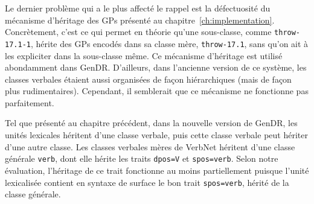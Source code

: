 Le dernier problème qui a le plus affecté le rappel est la défectuosité du mécanisme d'héritage des \acp{GP} présenté au chapitre~\ref{ch:implementation}. Concrètement, c'est ce qui permet en théorie qu'une sous-classe, comme \texttt{throw-17.1-1}, hérite des \acp{GP} encodés dans sa classe mère, \texttt{throw-17.1}, sans qu'on ait à les expliciter dans la sous-classe même. Ce mécanisme d'héritage est utilisé abondamment dans GenDR. D'ailleurs, dans l'ancienne version de ce système, les classes verbales étaient aussi organisées de façon hiérarchiques (mais de façon plus rudimentaires). Cependant, il semblerait que ce mécanisme ne fonctionne pas parfaitement.

Tel que présenté au chapitre précédent, dans la nouvelle version de GenDR, les unités lexicales héritent d'une classe verbale, puis cette classe verbale peut hériter d'une autre classe. Les classes verbales mères de VerbNet héritent d'une classe générale \texttt{verb}, dont elle hérite les traits \texttt{dpos=V} et \texttt{spos=verb}. Selon notre évaluation, l'héritage de ce trait fonctionne au moins partiellement puisque l'unité lexicalisée contient en syntaxe de surface le bon trait \texttt{spos=verb}, hérité de la classe générale.

